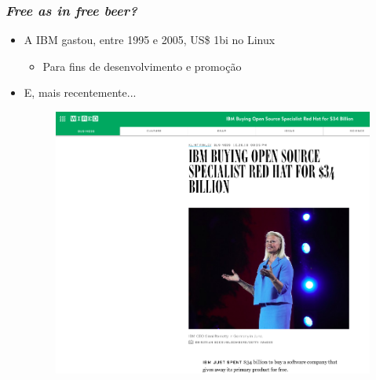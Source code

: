 \documentclass[xcolor=dvipsnames]{beamer}
\begin{document}
\begin{frame}
	\frametitle{\textit{Free as in free beer?}}
    \begin{itemize}
      \item A IBM gastou, entre 1995 e 2005, US\$ 1bi no Linux
        \begin{itemize}
        \item Para fins de desenvolvimento e promoção
        \end{itemize}\pause
      \vspace{0.2cm}
      \item E, mais recentemente...
      
 	\begin{figure}
	\begin{center}
 	\includegraphics[scale=0.22]{ibm_redhat.png}
	\end{center}
	\end{figure}
     
    \end{itemize}
\end{frame}
\end{document}
